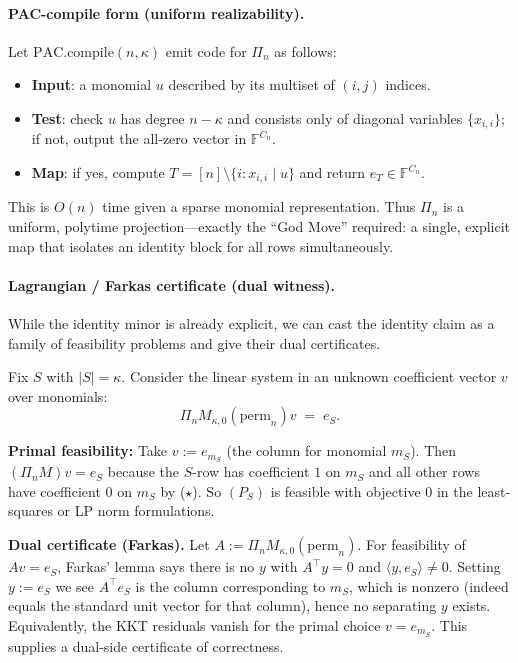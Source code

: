 \documentclass[12pt]{article}
\theoremstyle{definition}
\theoremstyle{definition}
\theoremstyle{remark}
\theoremstyle{remark}
\begin{document}
\paragraph{PAC-compile form (uniform realizability).}
Let $\mathrm{PAC.compile}(n,\kappa)$ emit code for $\Pi_n$ as follows:
\begin{itemize}
\item \textbf{Input}: a monomial $u$ described by its multiset of $(i,j)$ indices.
\item \textbf{Test}: check $u$ has degree $n - \kappa$ and consists only of diagonal variables $\{x_{i,i}\}$; if not, output the all-zero vector in $\mathbb{F}^{C_n}$.
\item \textbf{Map}: if yes, compute $T = [n] \setminus \{i : x_{i,i} \mid u\}$ and return $e_T \in \mathbb{F}^{C_n}$.
\end{itemize}
This is $O(n)$ time given a sparse monomial representation. Thus $\Pi_n$ is a uniform, polytime projection---exactly the ``God Move'' required: a single, explicit map that isolates an identity block for all rows simultaneously.

\paragraph{Lagrangian / Farkas certificate (dual witness).}
While the identity minor is already explicit, we can cast the identity claim as a family of feasibility problems and give their dual certificates.

Fix $S$ with $|S| = \kappa$. Consider the linear system in an unknown coefficient vector $v$ over monomials:
\[
\Pi_n M_{\kappa,0}(\mathrm{perm}_n) v \;=\; e_S. \tag{$P_S$}
\]

\textbf{Primal feasibility:} Take $v := e_{m_S}$ (the column for monomial $m_S$). Then $(\Pi_n M)v = e_S$ because the $S$-row has coefficient $1$ on $m_S$ and all other rows have coefficient $0$ on $m_S$ by ($\star$). So $(P_S)$ is feasible with objective $0$ in the least-squares or LP norm formulations.

\textbf{Dual certificate (Farkas).} Let $A := \Pi_n M_{\kappa,0}(\mathrm{perm}_n)$. For feasibility of $Av = e_S$, Farkas' lemma says there is no $y$ with $A^\top y = 0$ and $\langle y, e_S \rangle \neq 0$. Setting $y := e_S$ we see $A^\top e_S$ is the column corresponding to $m_S$, which is nonzero (indeed equals the standard unit vector for that column), hence no separating $y$ exists. Equivalently, the KKT residuals vanish for the primal choice $v = e_{m_S}$. This supplies a dual-side certificate of correctness.
\end{document}
